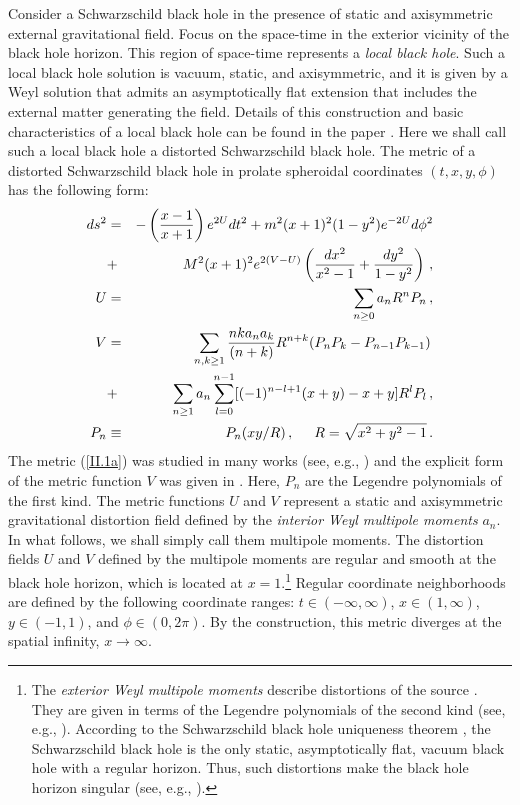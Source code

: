 \documentclass[twocolumn,showpacs,preprintnumbers,amsmath,amssymb,floatfix,nofootinbib]{revtex4-1}
\newcommand{\ba}{\begin{eqnarray}}
\newcommand{\ea}{\end{eqnarray}}
\newcommand{\non}{\nonumber}
\newcommand{\eq}[1]{(\ref{#1})}
\newcommand{\n}[1]{\label{#1}}
\newcommand{\hhh}{\, ,\hspace{0.5cm}}
\begin{document}
Consider a Schwarzschild black hole in the presence of static and axisymmetric external gravitational field. Focus on the space-time in the exterior vicinity of the black hole horizon. This region of space-time represents a {\em local black hole}. Such a local black hole solution is vacuum, static, and axisymmetric, and it is given by a Weyl solution that admits an asymptotically flat extension that includes the external matter generating the field. Details of this construction and basic characteristics of a local black hole can be found in the paper \cite{Geroch:1982bv}. Here we shall call such a local black hole a distorted Schwarzschild black hole. The metric of a distorted Schwarzschild black hole in prolate spheroidal coordinates $(t,x,y,\phi)$ has the following form: 
\ba
ds^{2}&=&-\left(\frac{x-1}{x+1}\right)e^{2U}dt^{2}+m^{2}(x+1)^{2}(1-y^{2})e^{-2U}d\phi^{2}\non\\
&+&M^{2}(x+1)^{2}e^{2(V-U)}\left(\frac{dx^{2}}{x^{2}-1}+\frac{dy^{2}}{1-y^{2}}\right)\,,\n{II.1a}\\
U&=&\sum_{n\geq0}a_{n}R^{n}P_{n}\,,\n{II.1b}\\
V&=&\sum_{n,k\geq1}\frac{nka_{n}a_{k}}{(n+k)}R^{n+k}(P_{n}P_{k}-P_{n-1}P_{k-1})\,\non\\
&+&\sum_{n\geq1}a_{n}\sum_{l=0}^{n-1}[(-1)^{n-l+1}(x+y)-x+y]R^{l}P_{l}\,,\n{II.1c}\\
P_{n}&\equiv&P_{n}(xy/R)\hhh R=\sqrt{x^{2}+y^{2}-1}\,.\non
\ea
The metric \eq{II.1a} was studied in many works (see, e.g., \cite{ER,Dor,Chandrasekhar,Hoenselaers:1979mk,Quevedo:1989rfm,Manko,Frolov:2007xi}) and the explicit form of the metric function $V$ was given in \cite{BDM}. Here, $P_n$ are the Legendre polynomials of the first kind. The metric functions $U$ and $V$ represent a static and axisymmetric gravitational distortion field defined by the {\em interior Weyl multipole moments} $a_{n}$. In what follows, we shall simply call them multipole moments. The distortion fields $U$ and $V$ defined by the multipole moments are regular and smooth at the black hole horizon, which is located at $x=1$.\footnote{The {\em exterior Weyl multipole moments} describe distortions of the source \cite{BDM,Breton:1998sr}. They are given in terms of the Legendre polynomials of the second kind (see, e.g., \cite{ER,Dor,Hoenselaers:1979mk,Quevedo:1989rfm,Manko,Breton:1998sr}). According to the Schwarzschild black hole uniqueness theorem \cite{Israel:1967wq}, the Schwarzschild black hole is the only static, asymptotically flat, vacuum black hole with a regular horizon. Thus, such distortions make the black hole horizon singular (see, e.g., \cite{Dor,Manko}).} Regular coordinate neighborhoods are defined by the following coordinate ranges: $t\in(-\infty, \infty)$, $x\in(1, \infty)$, $y\in(-1, 1)$, and $\phi\in(0, 2\pi)$. By the construction, this metric diverges at the spatial infinity, $x\to\infty$. 
\end{document}
